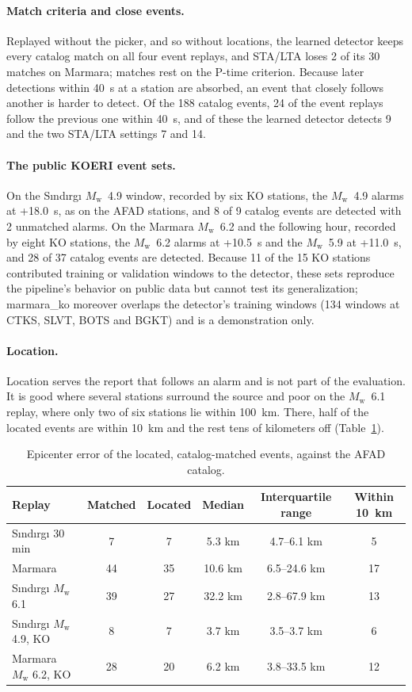 \documentclass[11pt,a4paper]{article}
\newcommand{\Mw}{$M_\mathrm{w}$}
\newcommand{\stalta}{STA/LTA}
\begin{document}
\paragraph{Match criteria and close events.} Replayed without the picker, and so
without locations, the learned detector keeps every catalog match on all four
event replays, and \stalta{} loses 2 of its 30 matches on Marmara; matches rest on
the P-time criterion. Because later detections within 40~s at a station are
absorbed, an event that closely follows another is harder to detect. Of the 188 catalog events, 24 of the event replays follow the previous one within 40~s, and of these the learned detector detects 9 and the two \stalta{} settings 7 and 14.

\paragraph{The public KOERI event sets.} On the S\i{}nd\i{}rg\i{} \Mw{}~4.9 window,
recorded by six KO stations, the \Mw{}~4.9 alarms at +18.0~s, as on the AFAD
stations, and 8 of 9 catalog events are detected with 2 unmatched alarms. On the
Marmara \Mw{}~6.2 and the following hour, recorded by eight KO stations, the
\Mw{}~6.2 alarms at +10.5~s and the \Mw{}~5.9 at +11.0~s, and 28 of 37 catalog
events are detected. Because 11 of the 15 KO stations contributed training or
validation windows to the detector, these sets reproduce the pipeline's behavior
on public data but cannot test its generalization; marmara\_ko moreover overlaps the
detector's training windows (134 windows at CTKS, SLVT, BOTS and BGKT) and is a
demonstration only.

\paragraph{Location.} Location serves the report that follows an alarm and is not
part of the evaluation. It is good where several stations surround the source and
poor on the \Mw{}~6.1 replay, where only two of six stations lie within 100~km. There, half of the located events are within 10~km and the rest tens of kilometers
off (Table~\ref{t:more}).

\begin{table}[htbp]
  \centering\small
  \caption{Epicenter error of the located, catalog-matched events, against the AFAD
  catalog.}\label{t:more}
  \begin{tabular}{@{}lccccc@{}}
    \toprule
    Replay & Matched & Located & Median & Interquartile range & Within 10~km \\
    \midrule
    S\i{}nd\i{}rg\i{} 30 min & 7 & 7 & 5.3 km & 4.7--6.1 km & 5 \\
    Marmara & 44 & 35 & 10.6 km & 6.5--24.6 km & 17 \\
    S\i{}nd\i{}rg\i{} \Mw{} 6.1 & 39 & 27 & 32.2 km & 2.8--67.9 km & 13 \\
    S\i{}nd\i{}rg\i{} \Mw{} 4.9, KO & 8 & 7 & 3.7 km & 3.5--3.7 km & 6 \\
    Marmara \Mw{} 6.2, KO & 28 & 20 & 6.2 km & 3.8--33.5 km & 12 \\
    \bottomrule
  \end{tabular}
\end{table}
\end{document}
